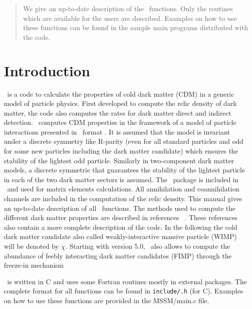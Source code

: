 \documentclass[12pt,a4paper]{article}
\begin{document}
\begin{abstract}
We give an up-to-date description of the \micro\ functions. Only the routines which are available for
the users are described.  Examples on how to use these functions
can be found in the sample main programs distributed with the code. 
\end{abstract}





\tableofcontents




\section{Introduction}
\micro\ is a code 
 to calculate the properties of cold dark matter (CDM)  in a generic model of particle physics.  
 First developed to compute the relic density of dark matter, 
 the code also computes the rates for dark matter direct and  indirect detection. 
 \micro\ computes CDM properties in the framework of a model of particle
 interactions presented in \calchep\ format \cite{Pukhov:2004ca}. 
 It is assumed that the model is invariant under  a discrete symmetry like R-parity (even for 
all standard particles and odd for some new particles including the dark matter candidate) which ensures 
the stability of the lightest  odd particle.  Similarly in two-component dark matter models,  a discrete symmetrie that guarantees the stability of the lightest particle in each of the two dark matter sectors  is assumed.
 The \calchep\  package is included in \micro\ and used for matrix elements calculations.
All annihilation and coannihilation channels are included in the computation of the relic density. 
This manual gives an up-to-date description of all \micro\ functions.  
The methods used to compute the different dark matter properties are described 
in references 
~\cite{Belanger:2001fz,Belanger:2004yn,Belanger:2006is,Belanger:2008sj,Belanger:2010gh,Belanger:2013oya,Belanger:2014vza,Barducci:2016pcb,Belanger:2018ccd}.
These references also contain  a more complete description of the code. In the following
the cold dark matter candidate also called weakly-interactive massive particle (WIMP)
will be denoted by $\chi$. 
Starting with version 5.0, \micro\ also allows to  compute
the abundance of feebly interacting dark matter candidates (FIMP) through the freeze-in
mechanism ~\cite{Belanger:2018ccd}


\micro\ is written in  C  and uses some Fortran routines mostly in external packages. 
The complete format  for all functions can be found in
\verb|include/.h| (for C). Examples on how to use these functions are provided   
in the MSSM/main.c file. 
 
\end{document}
